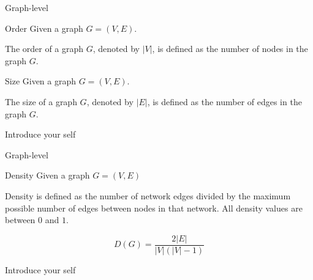 \documentclass{beamer}
\begin{document}
    \begin{frame}{Graph-level}
        \begin{exampleblock}{Order}
            Given a graph $G = (V, E)$.
            
            The order of a graph $G$, denoted by $|V|$, is defined as the number of nodes in the graph $G$.
            
        \end{exampleblock}

        \begin{exampleblock}{Size}
            Given a graph $G = (V, E)$.
            
            The size of a graph $G$, denoted by $|E|$, is defined as the number of edges in the graph $G$.
            
        \end{exampleblock}

        \begin{note}
            {Introduce your self}
        \end{note}
    \end{frame}
    
    \begin{frame}{Graph-level}
        \begin{exampleblock}{Density}
            Given a graph $G = (V, E)$
            
            Density is defined as the number of network edges divided by the maximum possible number of edges between nodes in that network. All density values are between $0$ and $1$.

            \begin{equation}
                D(G) = \frac{2|E|}{|V|(|V| - 1)}
            \end{equation}
            
        \end{exampleblock}

        
        \begin{note}
            {Introduce your self}
        \end{note}
    \end{frame}
\end{document}
